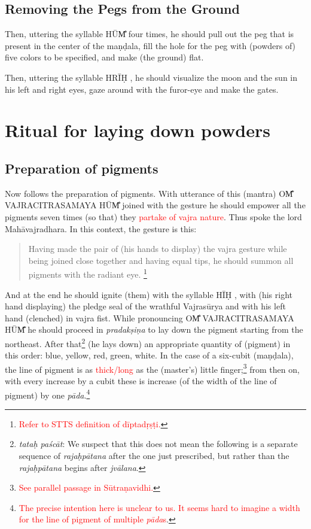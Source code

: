 \documentclass[11pt]{book}
\makeatletter
\def\fakesc#1{%
  \begingroup%
  \xdef\fake@name{\csname\curr@fontshape/\f@size\endcsname}%
  \fontsize{1.3\fontdimen8\fake@name}{\baselineskip}\selectfont%
  \uppercase{#1}%
  \endgroup%
}
\newcommand{\mantra}[1]{\fakesc{#1}}
\newcommand{\red}[1]{\textcolor{red}{#1}}
\newcommand{\skt}[1]{\emph{#1}}
\makeatother
\begin{document}
\subsection{Removing the Pegs from the Ground}
Then, uttering the syllable \mantra{hūm̐} four times, he should pull out the peg that is present in the center of the maṇḍala, fill the hole for the peg with (powders of) five colors to be specified, and make (the ground) flat. 

Then, uttering the syllable \mantra{hrīḥ}, he should visualize the moon and the sun in his left and right eyes, gaze around with the furor-eye and make the gates. 


\section{Ritual for laying down powders}

\subsection{Preparation of pigments}
Now follows the preparation of pigments. With utterance of this (mantra) \mantra{om̐ vajracitrasamaya hūm̐} joined with the gesture he should empower all the pigments seven times (so that) they \red{partake of vajra nature}. Thus spoke the lord Mahāvajradhara. In this context, the gesture is this:

\begin{verse}
Having made the pair of (his hands to display) the vajra gesture while being joined close together and having equal tips, 
he should summon all pigments with the radiant eye.%
\footnote{\red{Refer to STTS definition of dīptadṛṣṭi.}}
\end{verse}

And at the end he should ignite (them) with the syllable \mantra{hīḥ}, with (his right hand displaying) the pledge seal of the wrathful Vajrasūrya and with his left hand (clenched) in vajra fist. While pronouncing \mantra{om̐ vajracitrasamaya hūm̐} he should proceed in \emph{pradakṣiṇa} to lay down the pigment starting from the northeast. After that\footnote{\emph{tataḥ paścāt}: We suspect that this does not mean the following is a separate sequence of \emph{rajaḥpātana} after the one just prescribed, but rather than the \emph{rajaḥpātana} begins after \skt{jvālana}.} (he lays down) an appropriate quantity of (pigment) in this order: blue, yellow, red, green, white. In the case of a six-cubit (maṇḍala), the line of pigment is as \red{thick/long} as the (master's) little finger;\footnote{\red{See parallel passage in Sūtraṇavidhi.}} from then on, with every increase by a cubit these is increase (of the width of the line of pigment) by one \emph{pāda}.\footnote{\red{The precise intention here is unclear to us. It seems hard to imagine a width for the line of pigment of multiple \emph{pāda}s}.} 
\end{document}
